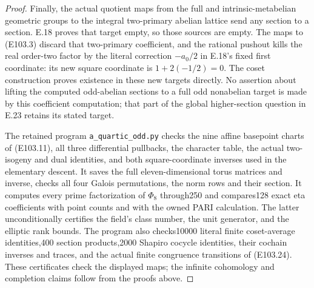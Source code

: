 \begin{proof}
Finally, the actual quotient maps from the full and
intrinsic-metabelian geometric groups to the integral
two-primary abelian lattice send any section to a section.
E.18 proves that target empty, so those sources are empty.
The maps to (E103.3) discard that two-primary coefficient,
and the rational pushout kills the real order-two factor by
the literal correction $-a_0/2$ in E.18's fixed first coordinate:
its new square coordinate is $1+2(-1/2)=0$.  The coset construction proves
existence in these new targets directly.  No assertion about
lifting the computed odd-abelian sections to a full odd
nonabelian target is made by this coefficient computation;
that part of the global higher-section question in E.23
retains its stated target.

The retained program \texttt{a\_quartic\_odd.py} checks the nine
affine basepoint charts of (E103.11), all three differential
pullbacks, the character table, the actual two-isogeny and
dual identities, and both square-coordinate inverses used
in the elementary descent.  It saves the full eleven-dimensional
torus matrices and inverse, checks all four Galois permutations,
the norm rows and their section.  It computes every prime
factorization of $\Phi _8$ through250 and compares128 exact
eta coefficients with point counts and with the owned PARI
calculation.  The latter unconditionally certifies the field's
class number, the unit generator, and the elliptic rank bounds.
The program also checks10000 literal finite coset-average
identities,400 section products,2000 Shapiro cocycle identities,
their cochain inverses and traces, and the actual finite
congruence transitions of (E103.24).  These certificates check
the displayed maps; the infinite cohomology and completion
claims follow from the proofs above.
\end{proof}
